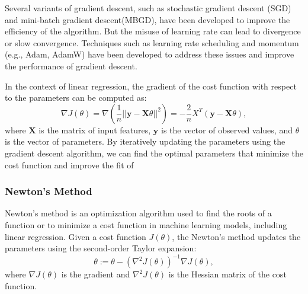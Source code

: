 \documentclass{article}
\begin{document}
Several variants of gradient descent, such as stochastic gradient descent (SGD) and mini-batch gradient descent(MBGD),
have been developed to improve the efficiency of the algorithm.
But the misuse of learning rate can lead to divergence or slow convergence.
Techniques such as learning rate scheduling and momentum (e.g., Adam\cite{kingma2017adammethodstochasticoptimization}, AdamW\cite{loshchilov2019decoupledweightdecayregularization}) have been developed to address these issues and improve the performance of gradient descent.

In the context of linear regression, the gradient of the cost function with respect to the parameters can be computed as:
\begin{equation}
    \nabla J(\theta) = \nabla(\frac{1}{n} ||\mathbf{y} - \mathbf{X}\theta||^2) = -\frac{2}{n} X^T (\mathbf{y} - \mathbf{X}\theta),
\end{equation}
where $\mathbf{X}$ is the matrix of input features, $\mathbf{y}$ is the vector of observed values, and $\theta$ is the vector of parameters.
By iteratively updating the parameters using the gradient descent algorithm, we can find the optimal parameters that minimize the cost function and improve the fit of

\subsubsection{Newton's Method}
Newton's method is an optimization algorithm used to find the roots of a function or to minimize a cost function in machine learning models,
including linear regression. 
Given a cost function $J(\theta)$, the Newton's method updates the parameters using the second-order Taylor expansion:
\begin{equation}
    \theta := \theta - (\nabla^2 J(\theta))^{-1} \nabla J(\theta),
\end{equation}
where $\nabla J(\theta)$ is the gradient and $\nabla^2 J(\theta)$ is the Hessian matrix of the cost function.   
\end{document}

